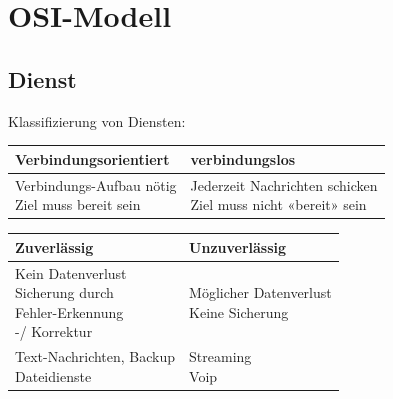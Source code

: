 
\section{OSI-Modell}
\subsection{Dienst}
{Klassifizierung von Diensten:}
\begin{center}

    \begin{tabular}{ | l | l |}
        \hline
        Verbindungsorientiert & verbindungslos    \\ \hline
        \makecell{Verbindungs-Aufbau nötig        \\ Ziel muss bereit sein} &
        \makecell{ Jederzeit Nachrichten schicken \\ Ziel muss nicht «bereit» sein} \\   \hline
    \end{tabular}

\end{center}
\begin{center}
    \begin{tabular}{ | l | l |}
        \hline
        Zuverlässig & Unzuverlässig          \\ \hline
        \makecell{Kein Datenverlust          \\ Sicherung durch \\Fehler-Erkennung \\ -/ Korrektur} &
        \makecell{ Möglicher Datenverlust    \\ Keine Sicherung} \\   \hline
        \makecell{  Text-Nachrichten, Backup \\ Dateidienste} & \makecell{Streaming \\ Voip}     \\   \hline
    \end{tabular}
\end{center}
\vfill\null
\columnbreak
